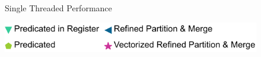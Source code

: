 \begin{figure}[p!]
\caption{Single Threaded Performance}
  \label{fig:single-threaded-performance}
\end{figure}

\begin{figure}[p!]
\hspace{-2.5em}
\includegraphics[height=5ex]{Figures/damon/LegendRight} 
\end{figure}

